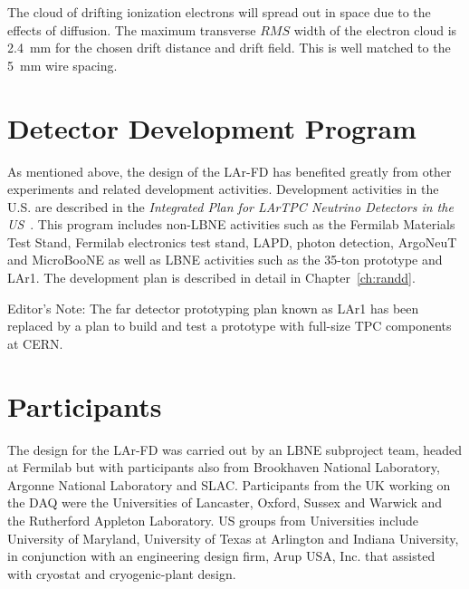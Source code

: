 The cloud of drifting ionization electrons will spread out in space due to the effects of diffusion. The maximum transverse $RMS$ width of the electron cloud is 2.4~mm for the chosen drift distance and drift field. This is well matched to the 5~mm wire spacing.

\section{Detector Development Program}


As mentioned above, the design of the LAr-FD has benefited greatly from other experiments and related development activities. Development activities in the U.S. are described in the  {\em Integrated Plan for LArTPC Neutrino Detectors in the US}~\cite{IP}. This program includes non-LBNE activities such as the Fermilab Materials Test Stand, Fermilab electronics test stand, LAPD, photon detection, ArgoNeuT and MicroBooNE as well as LBNE activities such as the 35-ton prototype and LAr1. The development plan is described in detail in Chapter~\ref{ch:randd}.


\begin{editornote}
  Editor's Note: The far detector prototyping plan known as LAr1 has been replaced by a plan to build and test a prototype with full-size TPC components at CERN.
\end{editornote}


\section{Participants}


The design for the LAr-FD was carried out by an LBNE subproject team, headed at Fermilab  but with participants also from Brookhaven National Laboratory, Argonne National Laboratory
 and SLAC.  Participants from the UK working on the DAQ were the Universities of Lancaster, Oxford, Sussex and Warwick and the Rutherford Appleton Laboratory.  US groups from Universities include University of Maryland, University of Texas at Arlington
and Indiana University, in conjunction with an engineering design firm, Arup USA, Inc. that assisted with cryostat and cryogenic-plant design. 


